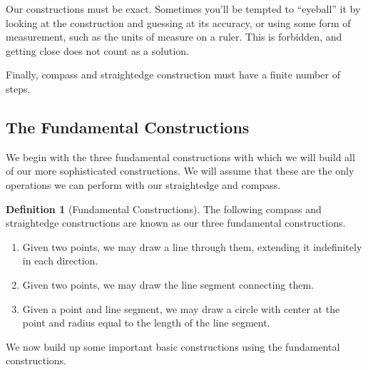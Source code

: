 \documentclass[11pt]{article}
\theoremstyle{definition}
\newtheorem{definition}[theorem]{Definition}
\begin{document}
Our constructions must be exact. Sometimes you'll be tempted to ``eyeball'' it by looking at the construction and guessing at its accuracy, 
or using some form of measurement, such as the units of measure on a ruler. This is forbidden, and getting close does not count as a solution.

Finally, compass and straightedge construction must have a finite number of steps.

\subsection{The Fundamental Constructions}

We begin with the three fundamental constructions with which we will build all of our more sophisticated constructions. We will assume that these
are the only operations we can perform with our straightedge and compass.

\begin{definition}[Fundamental Constructions] The following compass and straightedge constructions are known as our three fundamental constructions.
  \begin{enumerate}
    \item Given two points, we may draw a line through them, extending it indefinitely in each direction.
    \item Given two points, we may draw the line segment connecting them.
    \item Given a point and line segment, we may draw a circle with center at the point and radius equal to the length of the line segment.
  \end{enumerate}
\end{definition}

We now build up some important basic constructions using the fundamental constructions.
\end{document}
